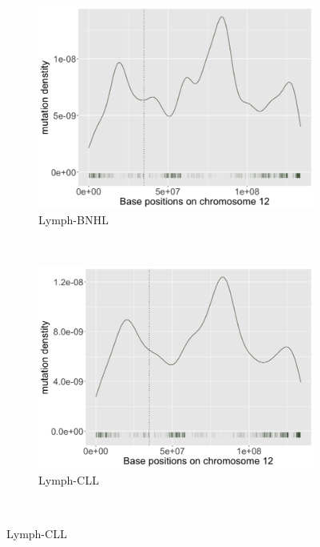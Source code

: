 \begin{figure}[ht!]
    \begin{subfigure}{.5\textwidth}
    \includegraphics[width=\linewidth,height=0.6\textwidth]{graphics/mutdistribution_Lymph-BNHL.png}
    \caption{Lymph-BNHL}
    \end{subfigure}
    ~
    \begin{subfigure}{.5\textwidth}
    \includegraphics[width=\linewidth,height=0.6\textwidth]{graphics/mutdistribution_Lymph-CLL.png}
    \caption{Lymph-CLL}
    \end{subfigure} \\
    \vspace{0.2cm}
    

\end{figure}
